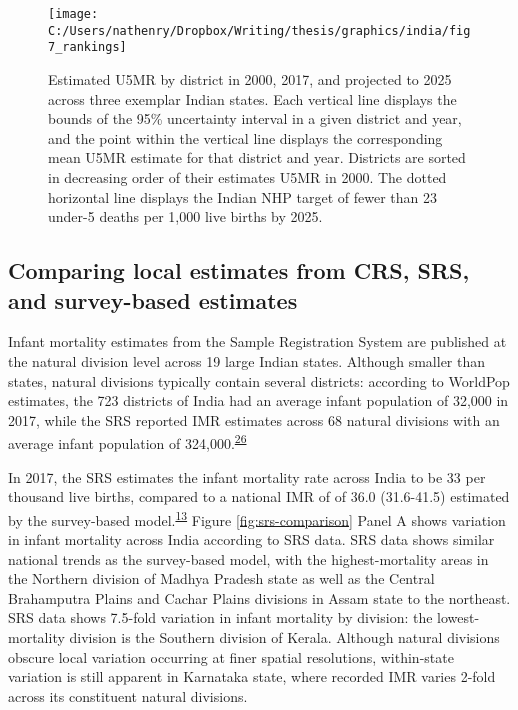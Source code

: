 \documentclass[
]{article}
\begin{document}
\begin{figure}[!hbt]

{\centering \texttt{[image: C:/Users/nathenry/Dropbox/Writing/thesis/graphics/india/fig7\_rankings]} 

}

\caption{Estimated U5MR by district in 2000, 2017, and projected to 2025 across three exemplar Indian states. Each vertical line displays the bounds of the 95\% uncertainty interval in a given district and year, and the point within the vertical line displays the corresponding mean U5MR estimate for that district and year. Districts are sorted in decreasing order of their estimates U5MR in 2000. The dotted horizontal line displays the Indian NHP target of fewer than 23 under-5 deaths per 1,000 live births by 2025.}\label{fig:rankings}
\end{figure}

\hypertarget{comparing-local-estimates-from-crs-srs-and-survey-based-estimates}{%
\subsection{Comparing local estimates from CRS, SRS, and survey-based estimates}\label{comparing-local-estimates-from-crs-srs-and-survey-based-estimates}}

Infant mortality estimates from the Sample Registration System are published at the natural division level across 19 large Indian states. Although smaller than states, natural divisions typically contain several districts: according to WorldPop estimates, the 723 districts of India had an average infant population of 32,000 in 2017, while the SRS reported IMR estimates across 68 natural divisions with an average infant population of 324,000.\textsuperscript{\protect\hyperlink{ref-Tatem2017}{26}}

In 2017, the SRS estimates the infant mortality rate across India to be 33 per thousand live births, compared to a national IMR of of 36.0 (31.6-41.5) estimated by the survey-based model.\textsuperscript{\protect\hyperlink{ref-CensusofIndia2017}{13}} Figure \ref{fig:srs-comparison} Panel A shows variation in infant mortality across India according to SRS data. SRS data shows similar national trends as the survey-based model, with the highest-mortality areas in the Northern division of Madhya Pradesh state as well as the Central Brahamputra Plains and Cachar Plains divisions in Assam state to the northeast. SRS data shows 7.5-fold variation in infant mortality by division: the lowest-mortality division is the Southern division of Kerala. Although natural divisions obscure local variation occurring at finer spatial resolutions, within-state variation is still apparent in Karnataka state, where recorded IMR varies 2-fold across its constituent natural divisions.
\end{document}

